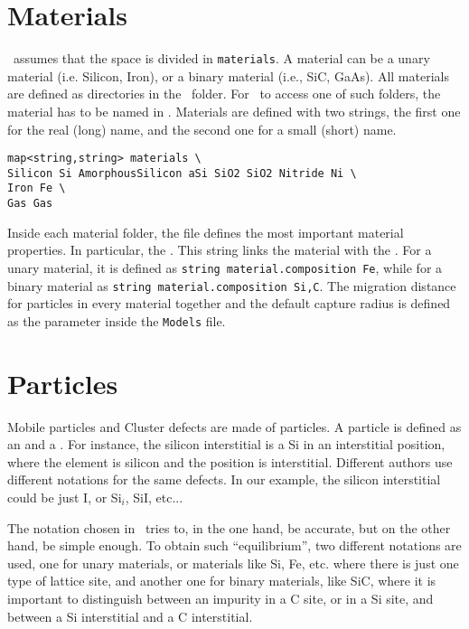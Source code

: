 \section{Materials}

\MMonCa\ assumes that the space is divided in {\tt materials}. A material can be a unary material (i.e. Silicon, Iron), or a binary material (i.e., SiC, GaAs). All materials are defined as directories in the  \MMonCa\ folder. For \MMonCa\ to access one of such folders, the material has to be named in . Materials are defined with two strings, the first one for the real (long) name, and the second one for a small (short) name.

\begin{lstlisting}
map<string,string> materials \
Silicon Si AmorphousSilicon aSi SiO2 SiO2 Nitride Ni \
Iron Fe \
Gas Gas 
\end{lstlisting}

Inside each material folder, the  file defines the most important material properties. In particular, the . This string links the material with the . For a unary material, it is defined as {\tt string material.composition Fe}, while for a binary material as {\tt string material.composition Si,C}. The migration distance for particles in every material together and the default capture radius is defined as the  parameter inside the {\tt Models} file.

\section{Particles}
\index{particle}

Mobile particles and Cluster defects are made of particles. A particle is defined as an  and a . For instance, the silicon interstitial is a Si in an interstitial position, where the element is silicon and the position is interstitial. Different authors use different notations for the same defects. In our example, the silicon interstitial could be just I, or Si$_i$, SiI, etc...

The notation chosen in \MMonCa\ tries to, in the one hand, be accurate, but on the other hand, be simple enough. To obtain such ``equilibrium'', two different notations are used, one for unary materials, or materials like Si, Fe, etc. where  there is just one type of lattice site, and another one for binary materials, like SiC, where it is important to distinguish between an impurity in a C site, or in a Si site, and between a Si interstitial and a C interstitial.

